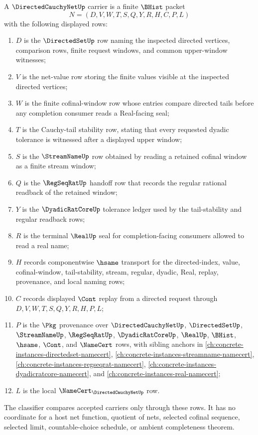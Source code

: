 \begin{definition}
\label{def:directed-cauchy-net-carrier}
A $\DirectedCauchyNetUp$ carrier is a finite $\BHist$ packet
$$
N=(D,V,W,T,S,Q,Y,R,H,C,P,L)
$$
with the following displayed rows:
\begin{enumerate}
\item $D$ is the $\DirectedSetUp$ row naming the inspected directed vertices, comparison rows, finite request windows, and common upper-window witnesses;
\item $V$ is the net-value row storing the finite values visible at the inspected directed vertices;
\item $W$ is the finite cofinal-window row whose entries compare directed tails before any completion consumer reads a Real-facing seal;
\item $T$ is the Cauchy-tail stability row, stating that every requested dyadic tolerance is witnessed after a displayed upper window;
\item $S$ is the $\StreamNameUp$ row obtained by reading a retained cofinal window as a finite stream window;
\item $Q$ is the $\RegSeqRatUp$ handoff row that records the regular rational readback of the retained window;
\item $Y$ is the $\DyadicRatCoreUp$ tolerance ledger used by the tail-stability and regular readback rows;
\item $R$ is the terminal $\RealUp$ seal for completion-facing consumers allowed to read a real name;
\item $H$ records componentwise $\hsame$ transport for the directed-index, value, cofinal-window, tail-stability, stream, regular, dyadic, Real, replay, provenance, and local naming rows;
\item $C$ records displayed $\Cont$ replay from a directed request through $D,V,W,T,S,Q,Y,R,H,P,L$;
\item $P$ is the $\Pkg$ provenance over $\DirectedCauchyNetUp$, $\DirectedSetUp$, $\StreamNameUp$, $\RegSeqRatUp$, $\DyadicRatCoreUp$, $\RealUp$, $\BHist$, $\hsame$, $\Cont$, and $\NameCert$ rows, with sibling anchors in \autoref{ch:concrete-instances-directedset-namecert}, \autoref{ch:concrete-instances-streamname-namecert}, \autoref{ch:concrete-instances-regseqrat-namecert}, \autoref{ch:concrete-instances-dyadicratcore-namecert}, and \autoref{ch:concrete-instances-real-namecert};
\item $L$ is the local $\NameCert_{\DirectedCauchyNetUp}$ row.
\end{enumerate}
The classifier compares accepted carriers only through these rows. It has no coordinate for a host net function, quotient of nets, selected cofinal sequence, selected limit, countable-choice schedule, or ambient completeness theorem.
\end{definition}

